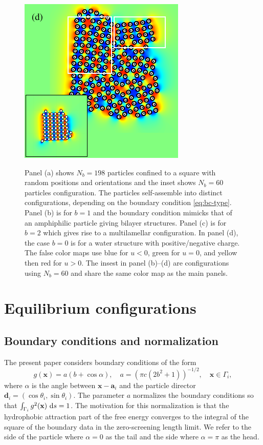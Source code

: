 \documentclass[aps,prl,preprint,groupedaddress]{revtex4-2}
\renewcommand{\aa}{\mathbf{a}}
\newcommand{\dd}{\mathbf{d}}
\newcommand{\xx}{\mathbf{x}}
\begin{document}
\begin{figure}[h!]
\begin{center}
  \includegraphics[height=0.3\textheight]{Nb198d_eta_inset.pdf}
\end{center}
\begin{caption}{\label{fig:relax}
  Panel (a) shows $N_b = 198$ particles confined to a square with random 
  positions and orientations and the inset shows $N_b=60$ particles configuration.
  The particles self-assemble into distinct configurations,
  depending on the boundary condition \eqref{eq:bc-type}.
  Panel (b) is for $b=1$ and the boundary condition mimicks that
  of an amphiphilic particle giving bilayer structures. 
  Panel (c) is for $b=2$ which gives rise to a multilamellar configuration. 
  In panel (d), the case $b = 0$ is for a water structure with
  positive/negative charge. 
  The false color maps use blue for $u < 0$, green for $u = 0$, and yellow then red for $u > 0$.
  The insest in panel (b)--(d) are configurations using $N_b=60$ and share the same color map
  as the main panels.}
\end{caption}
\end{figure}

\section{Equilibrium configurations}
\subsection{Boundary conditions and normalization}
The present paper considers boundary conditions of the form
\begin{equation}
  \label{eq:bc-type}
g(\xx) = a(b + \cos \alpha),\quad a = (\pi c(2b^2 + 1))^{-1/2},\quad \xx \in \Gamma_i,
\end{equation}
where $\alpha$ is the angle between $\xx - \aa_i$ and the particle director
$\dd_i = (\cos \theta_i, \sin \theta_i)$.
The parameter $a$ normalizes the boundary conditions 
so that $\int_{\Gamma_i} g^2(\xx) \, \dif s = 1$.
The motivation for this normalization is that the hydrophobic attraction
part of the free energy converges to the integral of the square of the boundary
data in the zero-screening length limit.  
We refer to the side of the particle where $\alpha = 0$
as the tail and the side where $\alpha = \pi$ as the head. 
\end{document}
